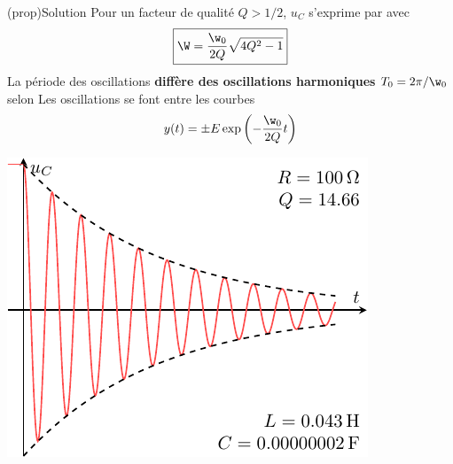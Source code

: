 \documentclass[../../main/main.tex]{subfiles}
\begin{document}
\begin{tcb}[label=prop:solupseudoper, sidebyside](prop){Solution}
	Pour un facteur de qualité $Q > 1/2$, $u_C$ s'exprime par
	avec
	\begin{equation*}
		\boxed{\W = \frac{\w_0}{2Q} \sqrt{4Q^2 - 1}}
	\end{equation*}
	La période des oscillations \textbf{diffère des oscillations harmoniques} $T_0
		= 2\pi/\w_0$ selon
	\tcblower
	Les oscillations se font entre les courbes
	\[y(t) = \pm E \exp \left( - \frac{\w_0}{2Q}t \right)\]
	\begin{center}
		\includegraphics[width=\linewidth]{carac-rlc-15}
	\end{center}
\end{tcb}
\end{document}
